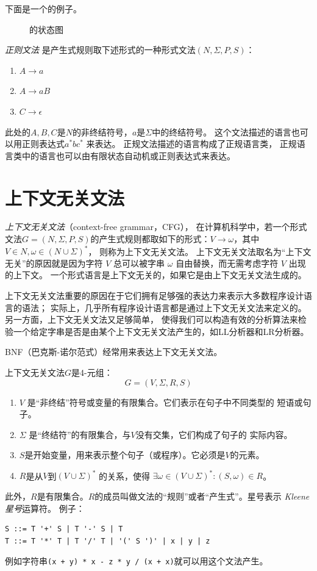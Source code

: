 下面是一个\DFA 的例子。
\begin{figure}[H]
  \centering
  
  \caption{\DFA 的状态图}
  \label{fig:DFAexample}
\end{figure}
\emph{正则文法} 是产生式规则取下述形式的一种形式文法$ (N, \Sigma, P, S) $：
\begin{enumerate}
  \item $A \rightarrow a$
  \item $A \rightarrow aB$
  \item $C \rightarrow \epsilon$
\end{enumerate}
此处的$A, B, C$是$N$的非终结符号，$a$是$\Sigma$中的终结符号。
这个文法描述的语言也可以用正则表达式$a^{*}bc^{*}$ 来表达。
正规文法描述的语言构成了正规语言类，
正规语言类中的语言也可以由有限状态自动机或正则表达式来表达。

\section{上下文无关文法}
\def\CFGTuple{$G = (N, \Sigma, P, S)$}
\emph{上下文无关文法}（context-free grammar，CFG），
在计算机科学中，若一个形式文法\CFGTuple 的产生式规则都取如下的形式：$V \rightarrow \omega$，其中$ V \in N, \omega \in (N \cup \Sigma)^{*} $，
则称为上下文无关文法。
上下文无关文法取名为“上下文无关”的原因就是因为字符 $V$ 总可以被字串 $\omega$ 自由替换，而无需考虑字符 $V$ 出现的上下文。
一个形式语言是上下文无关的，如果它是由上下文无关文法生成的。

上下文无关文法重要的原因在于它们拥有足够强的表达力来表示大多数程序设计语言的语法；
实际上，几乎所有程序设计语言都是通过上下文无关文法来定义的。
另一方面，上下文无关文法又足够简单，
使得我们可以构造有效的分析算法来检验一个给定字串是否是由某个上下文无关文法产生的，如LL分析器和LR分析器。

BNF（巴克斯-诺尔范式）经常用来表达上下文无关文法。

上下文无关文法$G$是4-元组：
\begin{equation*}
  G = (V, \Sigma, R, S)
\end{equation*}
\begin{enumerate}
  \item $V$ 是``非终结''符号或变量的有限集合。它们表示在句子中不同类型的
    短语或句子。
  \item $\Sigma$ 是``终结符''的有限集合，与$V$没有交集，它们构成了句子的
    实际内容。
  \item $S$是开始变量，用来表示整个句子（或程序）。它必须是$V$的元素。
  \item $R$是从$V$到$(V\cup\Sigma)^{*}$ 的关系，使得
    $ \exists \omega \in (V\cup\Sigma)^{*}: (S,\omega) \in R$。
\end{enumerate}
此外，$R$是有限集合。$R$的成员叫做文法的``规则''或者``产生式''。星号表示
\emph{Kleene星号}运算符。
例子：
\begin{lstlisting}
S ::= T '+' S | T '-' S | T
T ::= T '*' T | T '/' T | '(' S ')' | x | y | z
\end{lstlisting}
例如字符串\texttt{(x + y) * x - z * y / (x + x)}就可以用这个文法产生。
